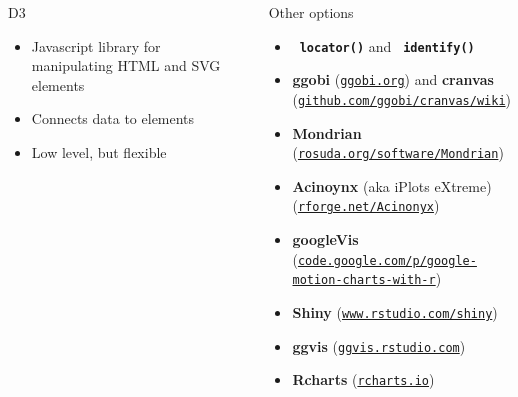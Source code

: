 \documentclass[final,plain]{beamer}
\newlength{\sepwid}
\newlength{\onecolwid}
\newcommand{\bi}{\begin{itemize}}
\newcommand{\ei}{\end{itemize}}
\newcommand{\ttsm}{\tt \small}
\newcommand{\bluebold}{\color{dblue} \bf}
\newcommand{\colonevsep}{\vspace{20mm}}
\begin{document}
\begin{frame}[t]
\begin{columns}[t]
\begin{column}{\onecolwid}
  \colonevsep %

    \begin{block}{D3}{

       \bi \itemsep18pt
       \item Javascript library for manipulating HTML and SVG elements
       \item Connects data to elements
       \item Low level, but flexible
       \ei
    }
    \end{block}

  \end{column}

  \begin{column}{\sepwid} \end{column} %

  \begin{column}{\onecolwid}

    \begin{block}{Other options}{

      \bi \itemsep18pt
      \item {\tt \bluebold locator()} and {\tt \bluebold identify()}
      \item {\bluebold ggobi} {\small (\href{http://ggobi.org}{\ttsm ggobi.org})} and
        {\bluebold cranvas}
        {\small (\href{https://github.com/ggobi/cranvas/wiki}{\ttsm github.com/ggobi/cranvas/wiki})}
      \item {\bluebold Mondrian}
        {\small (\href{http://rosuda.org/software/Mondrian/}{\ttsm rosuda.org/software/Mondrian})}
      \item {\bluebold Acinoynx} (aka iPlots eXtreme)
        {\small (\href{http://rforge.net/Acinonyx/}{\ttsm rforge.net/Acinonyx})}
      \item {\bluebold googleVis}
        {\small (\href{https://code.google.com/p/google-motion-charts-with-r/}{\ttsm code.google.com/p/google-motion-charts-with-r})}
      \item {\bluebold Shiny}
        {\small (\href{http://www.rstudio.com/shiny}{\ttsm www.rstudio.com/shiny})}
      \item {\bluebold ggvis}
        {\small (\href{http://ggvis.rstudio.com}{\ttsm ggvis.rstudio.com})}
      \item {\bluebold Rcharts}
        {\small (\href{http://rcharts.io}{\ttsm rcharts.io})}
      \ei

    }

    \end{block}


\end{column}
\end{columns}
\end{frame}
\end{document}
